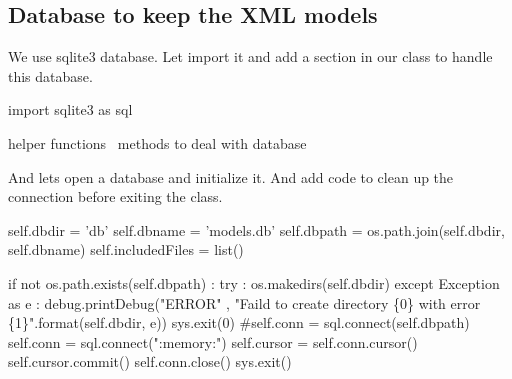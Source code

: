 \documentclass[]{article}%
\begin{document}
\eatline
{}\nwendcode{}\nwdocspar


\subsection{Database to keep the XML models}
\label{subsec:database}

  We use sqlite3 database. Let import it and add a section in our class to
  handle this database.

\nwenddocs{}\endmoddef\nwstartdeflinemarkup{}\nwenddeflinemarkup
import sqlite3 as sql 
\nwendcode{}\nwdocspar

\nwenddocs{}\endmoddef\nwstartdeflinemarkup{}\nwenddeflinemarkup
\LA{}helper functions~{\nwtagstyle{}}\RA{}
\LA{}methods to deal with database~{\nwtagstyle{}}\RA{}
\nwendcode{}\nwdocspar

  And lets open a database and initialize it. And add code to clean up the
  connection before exiting the class.

\nwenddocs{}\endmoddef\nwstartdeflinemarkup{}\nwenddeflinemarkup
self.dbdir = 'db'
self.dbname = 'models.db'
self.dbpath = os.path.join(self.dbdir, self.dbname)
self.includedFiles = list()

if not os.path.exists(self.dbpath) :
  try :
    os.makedirs(self.dbdir)
  except Exception as e :
    debug.printDebug("ERROR"
        , "Faild to create directory \{0\} with error \{1\}".format(self.dbdir, e))
    sys.exit(0)
#self.conn = sql.connect(self.dbpath)
self.conn = sql.connect(":memory:")
self.cursor = self.conn.cursor()
\eatline
{}\nwendcode{}\nwdocspar
\nwenddocs{}\endmoddef\nwstartdeflinemarkup{}\nwenddeflinemarkup
self.cursor.commit()
self.conn.close()
sys.exit()
\eatline
{}\nwendcode{}\nwdocspar
\end{document}
